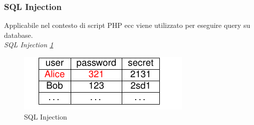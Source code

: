 \documentclass[12pt]{article}
\begin{document}
			\subsubsection{SQL Injection}
				Applicabile nel contesto di script PHP ecc viene utilizzato per eseguire query su database. \\
				
				\textit{SQL Injection \ref{fig:30}}\\
				\begin{figure}[h!]
					\centering
					\includegraphics[scale=0.60]{img/sqltable.PNG}
					\caption{SQL Injection \label{fig:30}}
				\end{figure}\\
				
\end{document}
